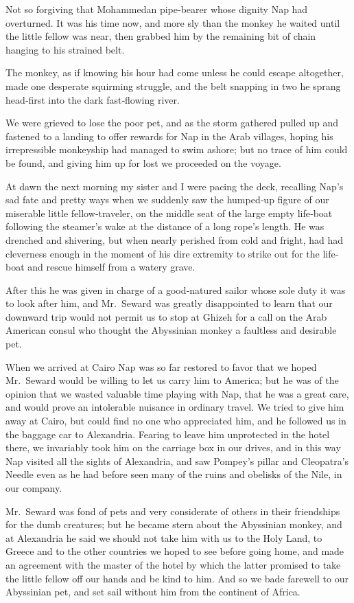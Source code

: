 \documentclass[12pt]{book}
\begin{document}
Not so forgiving that Mohammedan pipe‐bearer whose dignity Nap had overturned. It was his time now, and more sly than the monkey he waited until the
little fellow was near, then grabbed him by the remaining bit of chain hanging to
his strained belt.

The monkey, as if knowing his hour had come unless he could escape altogether, made one desperate squirming struggle, and the belt snapping in two he
sprang head‐first into the dark fast‐flowing river.

We were grieved to lose the poor pet, and as the storm gathered pulled up
and fastened to a landing to offer rewards for Nap in the Arab villages, hoping
his irrepressible monkeyship had managed to swim ashore; but no trace of him
could be found, and giving him up for lost we proceeded on the voyage.

At dawn the next morning my sister and I were pacing the deck, recalling
Nap’s sad fate and pretty ways when we suddenly saw the humped‐up figure of
our miserable little fellow‐traveler, on the middle seat of the large empty life‐boat
following the steamer’s wake at the distance of a long rope’s length. He was
drenched and shivering, but when nearly perished from cold and fright, had
had cleverness enough in the moment of his dire extremity to strike out for the
life‐boat and rescue himself from a watery grave.

After this he was given in charge of a good‐natured sailor whose sole duty
it was to look after him, and Mr.~Seward was greatly disappointed to learn that
our downward trip would not permit us to stop at Ghizeh for a call on the Arab
American consul who thought the Abyssinian monkey a faultless and desirable
pet.

When we arrived at Cairo Nap was so far restored to favor that we hoped
Mr.~Seward would be willing to let us carry him to America; but he was of the
opinion that we wasted valuable time playing with Nap, that he was a great care,
and would prove an intolerable nuisance in ordinary travel. We tried to give him
away at Cairo, but could find no one who appreciated him, and he followed us
in the baggage car to Alexandria. Fearing to leave him unprotected in the hotel
there, we invariably took him on the carriage box in our drives, and in this way
Nap visited all the sights of Alexandria, and saw Pompey’s pillar and Cleopatra’s
Needle even as he had before seen many of the ruins and obelisks of the Nile, in
our company.

Mr.~Seward was fond of pets and very considerate of others in their friendships
for the dumb creatures; but he became stern about the Abyssinian monkey, and
at Alexandria he said we should not take him with us to the Holy Land, to Greece
and to the other countries we hoped to see before going home, and made an
agreement with the master of the hotel by which the latter promised to take the
little fellow off our hands and be kind to him. And so we bade farewell to our
Abyssinian pet, and set sail without him from the continent of Africa.
\end{document}
